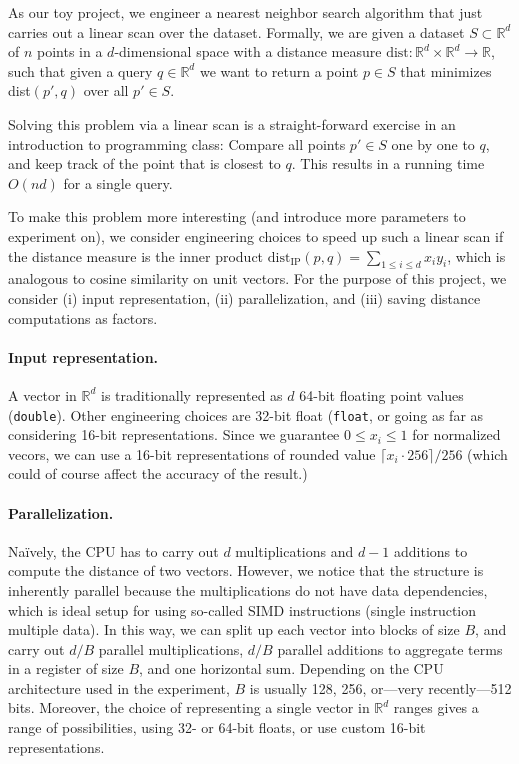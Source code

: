 \documentclass{llncs}
\begin{document}
As our toy project, we engineer a nearest neighbor search algorithm that just carries out a linear scan over the dataset. 
Formally, we are given a dataset $S \subset \mathbb{R}^d$ of $n$ points in a $d$-dimensional space with a distance measure $\text{dist}\colon \mathbb{R}^d \times \mathbb{R}^d \rightarrow \mathbb{R}$, such that given a query $q \in \mathbb{R}^d$ we want to return a point $p \in S$ that minimizes dist$(p', q)$ over all $p' \in S$.

Solving this problem via a linear scan is a straight-forward exercise in an introduction to programming class: Compare all points $p' \in S$ one by one to $q$, and keep track of the point that is closest to $q$. This results in a running time $O(nd)$ for a single query.

To make this problem more interesting (and introduce more parameters to experiment on), we consider engineering choices to speed up such a linear scan if the distance measure is the inner product $\text{dist}_{\text{IP}}(p,q) = \sum_{1 \leq i \leq d} x_i y_i$, which is analogous to cosine similarity on unit vectors. For the purpose of this project, we consider (i) input representation, (ii) parallelization, and (iii) saving distance computations as factors.

\paragraph{Input representation.}
A vector in $\mathbb{R}^d$ is traditionally represented as $d$ 64-bit floating point values (\texttt{double}). Other engineering choices are 32-bit float (\texttt{float}, or going as far as considering 16-bit representations. Since we guarantee $0 \leq x_i \leq 1$ for normalized vecors, we can use a 16-bit representations of rounded value $\lceil x_i \cdot 256 \rceil / 256$ (which could of course affect the accuracy of the result.)

\paragraph{Parallelization.}
Naïvely, the CPU has to carry out $d$ multiplications and $d-1$ additions to compute the distance of two vectors.
However, we notice that the structure is inherently parallel because the multiplications do not have data dependencies, which is ideal setup for using so-called SIMD instructions (single instruction multiple data). 
In this way, we can split up each vector into blocks of size $B$, and carry out $d/B$ parallel multiplications, $d/B$ parallel additions to aggregate terms in a register of size $B$, and one horizontal sum. 
Depending on the CPU architecture used in the experiment, $B$ is usually 128, 256, or---very recently---512 bits. Moreover, the choice of representing a single vector in $\mathbb{R}^d$ ranges gives a range of possibilities, using 32- or 64-bit floats, or use custom 16-bit representations.
\end{document}
